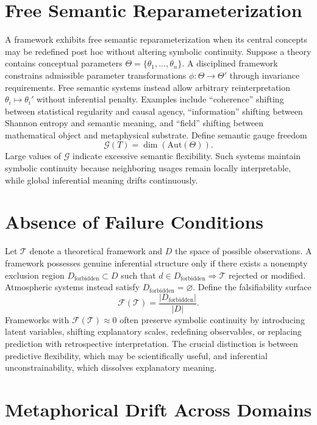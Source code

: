 \documentclass[12pt, openright, twoside]{book}
\begin{document}
\section{Free Semantic Reparameterization}

A framework exhibits free semantic reparameterization when its central
concepts may be redefined post hoc without altering symbolic continuity.
Suppose a theory contains conceptual parameters
$\Theta = \{\theta_1, \ldots, \theta_n\}$. A disciplined framework
constrains admissible parameter transformations $\phi : \Theta \to \Theta'$
through invariance requirements. Free semantic systems instead allow
arbitrary reinterpretation $\theta_i \mapsto \theta_i'$ without inferential
penalty. Examples include ``coherence'' shifting between statistical
regularity and causal agency, ``information'' shifting between Shannon
entropy and semantic meaning, and ``field'' shifting between mathematical
object and metaphysical substrate. Define semantic gauge freedom
\[
\mathcal{G}(T)
= \dim(\mathrm{Aut}(\Theta)).
\]
Large values of $\mathcal{G}$ indicate excessive semantic flexibility. Such
systems maintain symbolic continuity because neighboring usages remain
locally interpretable, while global inferential meaning drifts continuously.

\section{Absence of Failure Conditions}

Let $\mathcal{T}$ denote a theoretical framework and $D$ the space of
possible observations. A framework possesses genuine inferential structure
only if there exists a nonempty exclusion region
$D_{\mathrm{forbidden}} \subset D$ such that
$d \in D_{\mathrm{forbidden}} \Rightarrow \mathcal{T}$ rejected or modified.
Atmospheric systems instead satisfy $D_{\mathrm{forbidden}} = \varnothing$.
Define the falsifiability surface
\[
\mathcal{F}(\mathcal{T})
= \frac{|D_{\mathrm{forbidden}}|}{|D|}.
\]
Frameworks with $\mathcal{F}(\mathcal{T}) \approx 0$ often preserve symbolic
continuity by introducing latent variables, shifting explanatory scales,
redefining observables, or replacing prediction with retrospective
interpretation. The crucial distinction is between predictive flexibility,
which may be scientifically useful, and inferential unconstrainability,
which dissolves explanatory meaning.

\section{Metaphorical Drift Across Domains}
\end{document}
